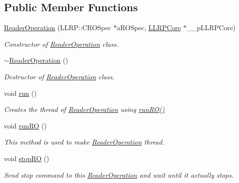 \subsection*{Public Member Functions}
\begin{DoxyCompactItemize}
\item 
\hyperlink{class_e_l_f_i_n_1_1_reader_operation_a0cf397b0aa83e1c5c9df1a1af6a04e93}{Reader\-Operation} (L\-L\-R\-P\-::\-C\-R\-O\-Spec $\ast$a\-R\-O\-Spec, \hyperlink{class_e_l_f_i_n_1_1_l_l_r_p_core}{L\-L\-R\-P\-Core} $\ast$\-\_\-\-\_\-p\-L\-L\-R\-P\-Core)
\begin{DoxyCompactList}\small\item\em Constructor of \hyperlink{class_e_l_f_i_n_1_1_reader_operation}{Reader\-Operation} class. \end{DoxyCompactList}\item 
\hyperlink{class_e_l_f_i_n_1_1_reader_operation_a22908408aa9e1c3204a1f9ad051a29b7}{$\sim$\-Reader\-Operation} ()
\begin{DoxyCompactList}\small\item\em Destructor of \hyperlink{class_e_l_f_i_n_1_1_reader_operation}{Reader\-Operation} class. \end{DoxyCompactList}\item 
void \hyperlink{class_e_l_f_i_n_1_1_reader_operation_a2b2d664c61b9405567cd0fde3a488261}{run} ()
\begin{DoxyCompactList}\small\item\em Creates the thread of \hyperlink{class_e_l_f_i_n_1_1_reader_operation}{Reader\-Operation} using \hyperlink{class_e_l_f_i_n_1_1_reader_operation_a7046ea97bbe32c4f4d8dc65874f0f7bb}{run\-R\-O()} \end{DoxyCompactList}\item 
void \hyperlink{class_e_l_f_i_n_1_1_reader_operation_a7046ea97bbe32c4f4d8dc65874f0f7bb}{run\-R\-O} ()
\begin{DoxyCompactList}\small\item\em This method is used to make \hyperlink{class_e_l_f_i_n_1_1_reader_operation}{Reader\-Operation} thread. \end{DoxyCompactList}\item 
void \hyperlink{class_e_l_f_i_n_1_1_reader_operation_af2a3eca438c14f42f68f3558f6c0e908}{stop\-R\-O} ()
\begin{DoxyCompactList}\small\item\em Send stop command to this \hyperlink{class_e_l_f_i_n_1_1_reader_operation}{Reader\-Operation} and wait until it actually stops. \end{DoxyCompactList}\item 

\end{DoxyCompactItemize}
